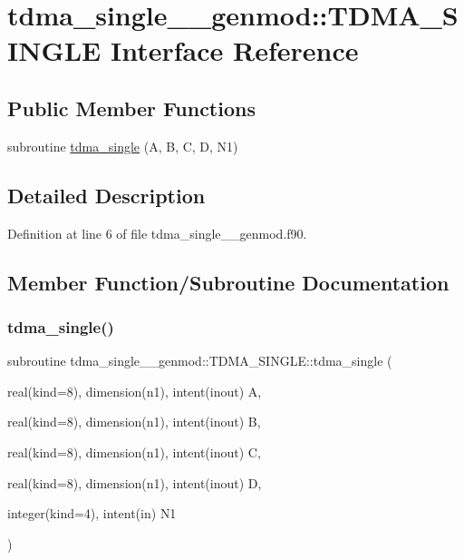 \hypertarget{interfacetdma__single____genmod_1_1_t_d_m_a___s_i_n_g_l_e}{}\section{tdma\+\_\+single\+\_\+\+\_\+genmod\+::T\+D\+M\+A\+\_\+\+S\+I\+N\+G\+LE Interface Reference}
\label{interfacetdma__single____genmod_1_1_t_d_m_a___s_i_n_g_l_e}
\subsection*{Public Member Functions}
\begin{DoxyCompactItemize}
\item 
subroutine \mbox{\hyperlink{interfacetdma__single____genmod_1_1_t_d_m_a___s_i_n_g_l_e_a98bdf4e7b06fa82ab7753d152083de8d}{tdma\+\_\+single}} (A, B, C, D, N1)
\end{DoxyCompactItemize}


\subsection{Detailed Description}


Definition at line 6 of file tdma\+\_\+single\+\_\+\+\_\+genmod.\+f90.



\subsection{Member Function/\+Subroutine Documentation}
\mbox{\label{interfacetdma__single____genmod_1_1_t_d_m_a___s_i_n_g_l_e_a98bdf4e7b06fa82ab7753d152083de8d}} 
\subsubsection{\texorpdfstring{tdma\_single()}{tdma\_single()}}
{\footnotesize\ttfamily subroutine tdma\+\_\+single\+\_\+\+\_\+genmod\+::\+T\+D\+M\+A\+\_\+\+S\+I\+N\+G\+L\+E\+::tdma\+\_\+single (\begin{DoxyParamCaption}\item[{real(kind=8), dimension(n1), intent(inout)}]{A,  }\item[{real(kind=8), dimension(n1), intent(inout)}]{B,  }\item[{real(kind=8), dimension(n1), intent(inout)}]{C,  }\item[{real(kind=8), dimension(n1), intent(inout)}]{D,  }\item[{integer(kind=4), intent(in)}]{N1 }\end{DoxyParamCaption})}



